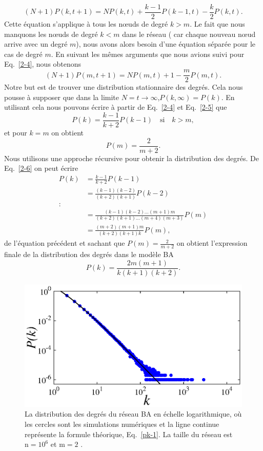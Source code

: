 \begin{equation}
(N+1)P(k,t+1)=NP(k,t)+\frac{k-1}{2}P(k-1,t)-\frac{k}{2}P(k,t).
\label{2-4}
\end{equation}
Cette équation s'applique à tous les nœuds de degré $k>m$. Le fait que nous manquons les nœuds de degré $k<m$ dans le réseau ( car chaque nouveau nœud arrive avec un degré $m$), nous avons alors besoin d'une équation séparée pour le cas de degré $m$. En suivant les mêmes arguments que nous avions suivi pour Eq.~\eqref{2-4}, nous obtenons
\begin{equation}
(N+1)P(m,t+1)=NP(m,t)+1-\frac{m}{2}P(m,t).
\label{2-5}
\end{equation}
Notre but est de trouver une distribution stationnaire des degrés. Cela nous pousse à supposer que dans la limite $N=t\longrightarrow \infty$,$P(k,\infty)=P(k)$. En utilisant cela nous pouvons écrire à partir de Eq.~\eqref{2-4} et Eq.~\eqref{2-5} que
\begin{equation}
P(k)=\frac{k-1}{k+2}P(k-1) \quad \text{si}\quad k>m,
\label{2-6}
\end{equation}
et pour $k=m$ on obtient
\begin{equation}
P(m)=\frac{2}{m+2}.
\end{equation}
Nous utilisons une approche récursive pour obtenir la distribution des degrés. De Eq.~\eqref{2-6} on peut écrire
\begin{align}
P(k)&=\frac{k-1}{k+2}P(k-1)\nonumber\\
&=\frac{(k-1)(k-2)}{(k+2)(k+1)}P(k-2)\nonumber\\
\colon\nonumber\\
&=\frac{(k-1)(k-2)...(m+1)m}{(k+2)(k+1)...(m+4)(m+3)}P(m)\nonumber\\
&=\frac{(m+2)(m+1)m}{(k+2)(k+1)k}P(m),
\end{align}
de l'équation précédent et sachant que $P(m)=\frac{2}{m+2}$ on obtient l'expression finale de la distribution des degrés dans le modèle BA
\begin{equation}
P(k)=\dfrac{2m(m+1)}{k(k+1)(k+2)}.
\label{pk-1}
\end{equation}
\begin{figure}[h!]
	\centering
	\includegraphics[scale=1]{./figures/fig-barabasi}
	\caption{La distribution des degrés du réseau BA en échelle logarithmique, où les cercles sont les simulations numériques et la ligne continue représente la formule théorique, Eq.~\eqref{pk-1}. La taille du réseau est $\mathrm{n}=10^{6}$ et $\mathrm{m}=2$ .}	
	\label{BA-distribution}
\end{figure}

